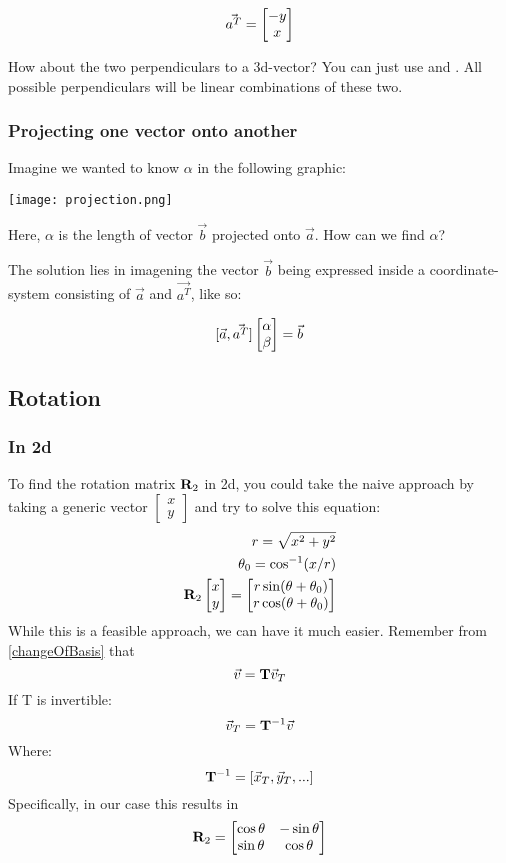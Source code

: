 $$ \vec{a^T} =  \begin{bmatrix}  -y \\ x  \\ \end{bmatrix}  $$


How about the two perpendiculars to a 3d-vector? You can just use  and . All possible perpendiculars will be linear combinations of these two.


\subsubsection{Projecting one vector onto another}

Imagine we wanted to know $\alpha$ in the following graphic:

\texttt{[image: projection.png]}

Here, $\alpha$ is the length of vector $\vec{b}$ projected onto $\vec{a}$. How can we find $\alpha$?

The solution lies in imagening the vector $\vec{b}$ being expressed inside a coordinate-system consisting of $\vec{a}$ and $\vec{a^T}$, like so: 

$$ [ \vec{a}, \vec{a^T} ]  \begin{bmatrix}  \alpha \\ \beta  \\ \end{bmatrix}  = \vec{b} $$

\subsection{Rotation}

\subsubsection{In 2d}
To find the rotation matrix $\mathbf{R}_2$  in 2d, you could take the naive approach by taking a generic vector $\begin{bmatrix}x \\ y\end{bmatrix}$ and try to solve this equation: 
\begin{align}
    r = \sqrt{x^2 + y^2} \\
    \theta_0 = \cos^{-1}(x/r) \\
    \mathbf{R}_2 \begin{bmatrix}x \\ y\end{bmatrix} = \begin{bmatrix} 
        r \sin(\theta + \theta_0) \\
        r \cos(\theta + \theta_0)
    \end{bmatrix}
\end{align}
While this is a feasible approach, we can have it much easier. Remember from \ref{changeOfBasis} that 
$$ \vec{v} = \mathbf{T} \vec{v}_T $$
If T is invertible:
$$ \vec{v}_T = \mathbf{T}^{-1} \vec{v} $$
Where:
$$ \mathbf{T}^{-1} = [\vec{x}_T, \vec{y}_T, ...] $$
Specifically, in our case this results in 
$$ \mathbf{R}_2 = \begin{bmatrix} 
    \cos{\theta} & -\sin{\theta} \\
    \sin{\theta} & \cos{\theta}
\end{bmatrix} $$

